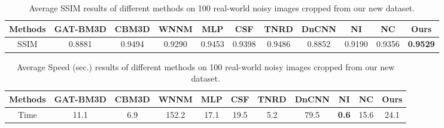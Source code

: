 \begin{table}[t!]
\begin{adjustwidth}{-.2cm}{}
\scriptsize
\caption{Average SSIM \cite{ssim} results of different methods on 100 real-world noisy images cropped from our new dataset.}
\label{tab3-7}
\begin{center}
\renewcommand\arraystretch{1}
\begin{tabular}{|c||c|c|c|c|c|c|c|c|c|c|}
\hline
Methods
&\textbf{GAT-BM3D}
&\textbf{CBM3D}
&\textbf{WNNM}
&\textbf{MLP}
&\textbf{CSF} 
&\textbf{TNRD} 
&\textbf{DnCNN}
&\textbf{NI} 
&\textbf{NC} 
&\textbf{Ours} 
\\
\hline
SSIM  
& 0.8881 & 0.9494 & 0.9290 & 0.9453 & 0.9398 & 0.9486 & 0.8852 & 0.9190 & 0.9356 & \textbf{0.9529}
\\
\hline
\end{tabular}
\end{center}
\end{adjustwidth}\vspace{-4mm}
\end{table}



\begin{table}[t!]
\begin{adjustwidth}{-.2cm}{}
\scriptsize
\caption{Average Speed (sec.) results of different methods on 100 real-world noisy images cropped from our new dataset.}
\label{tab3-8}
\begin{center}
\renewcommand\arraystretch{1}
\begin{tabular}{|c||c|c|c|c|c|c|c|c|c|c|}
\hline
Methods
&\textbf{GAT-BM3D}
&\textbf{CBM3D}
&\textbf{WNNM}
&\textbf{MLP}
&\textbf{CSF} 
&\textbf{TNRD} 
&\textbf{DnCNN}
&\textbf{NI} 
&\textbf{NC} 
&\textbf{Ours} 
\\
\hline
Time  
& 11.1 & 6.9 & 152.2 & 17.1 & 19.5 & 5.2 & 79.5 & \textbf{0.6} & 15.6 & 24.1
\\
\hline
\end{tabular}
\end{center}
\end{adjustwidth}\vspace{-0mm}
\end{table}



